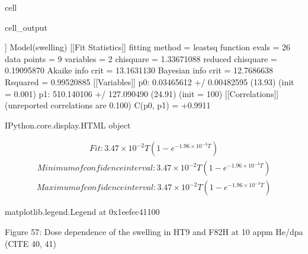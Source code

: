 \documentclass[letterpaper,10pt,english]{jupyterBook}
\begin{document}
\begin{sphinxuseclass}{cell}
\begin{sphinxVerbatimOutput}
\begin{sphinxuseclass}{cell_output}
				\begin{sphinxVerbatim}[commandchars=\\\{\}]
					[[Model]]
					Model(swelling)
					[[Fit Statistics]]
					\PYGZsh{} fitting method   = leastsq
					\PYGZsh{} function evals   = 26
					\PYGZsh{} data points      = 9
					\PYGZsh{} variables        = 2
					chi\PYGZhy{}square         = 1.33671088
					reduced chi\PYGZhy{}square = 0.19095870
					Akaike info crit   = \PYGZhy{}13.1631130
					Bayesian info crit = \PYGZhy{}12.7686638
					R\PYGZhy{}squared          = 0.99520885
					[[Variables]]
					p\PYGZus{}0:  0.03465612 +/\PYGZhy{} 0.00482595 (13.93\PYGZpc{}) (init = 0.001)
					p\PYGZus{}1:  510.140106 +/\PYGZhy{} 127.090490 (24.91\PYGZpc{}) (init = 100)
					[[Correlations]] (unreported correlations are \PYGZlt{} 0.100)
					C(p\PYGZus{}0, p\PYGZus{}1) = +0.9911
				\end{sphinxVerbatim}
				
				\begin{sphinxVerbatim}[commandchars=\\\{\}]
					\PYGZlt{}IPython.core.display.HTML object\PYGZgt{}
				\end{sphinxVerbatim}
				
				\sphinxAtStartPar
				\begin{equation*}
					\begin{split}Fit: \boxed{ 3.47 \times 10^{-2} T \left(1 - e^{- 1.96 \times 10^{-3} T}\right) }\end{split}
				\end{equation*}\begin{equation*}
					\begin{split}Minimum of confidence interval: \boxed{ 3.47 \times 10^{-2} T \left(1 - e^{- 1.96 \times 10^{-3} T}\right) }\end{split}
				\end{equation*}\begin{equation*}
					\begin{split}Maximum of confidence interval: \boxed{ 3.47 \times 10^{-2} T \left(1 - e^{- 1.96 \times 10^{-3} T}\right) }\end{split}
				\end{equation*}
				\begin{sphinxVerbatim}[commandchars=\\\{\}]
					\PYGZlt{}matplotlib.legend.Legend at 0x1eefec41100\PYGZgt{}
				\end{sphinxVerbatim}
				
				\noindent{}
				
		\end{sphinxuseclass}\end{sphinxVerbatimOutput}
		
	\end{sphinxuseclass}
	\sphinxAtStartPar
	Figure 57: Dose dependence of the swelling in HT9 and F82H at 10 appm He/dpa (CITE 40, 41)
	
\end{document}
